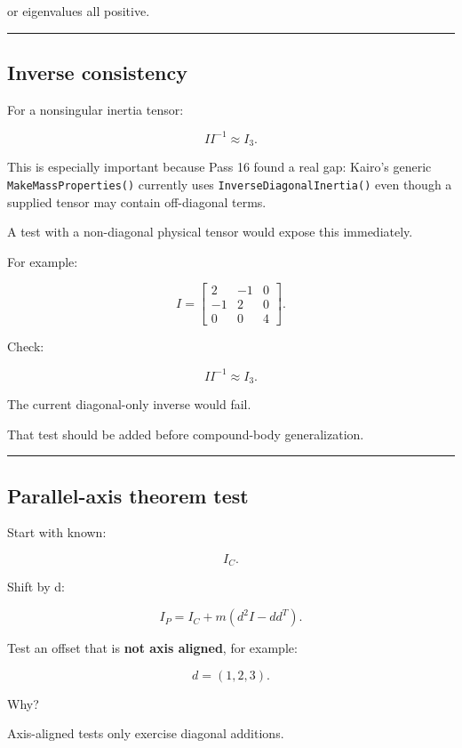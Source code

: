 or eigenvalues all positive.

\begin{center}\rule{0.5\linewidth}{0.5pt}\end{center}

\subsection{Inverse consistency}\label{06-engine-ii-ch039-inverse-consistency}

For a nonsingular inertia tensor:

\[
\boxed{
II^{-1}\approx I_3.
}
\]

This is especially important because Pass 16 found a real gap: Kairo's generic \texttt{MakeMassProperties()} currently uses \texttt{InverseDiagonalInertia()} even though a supplied tensor may contain off-diagonal terms.

A test with a non-diagonal physical tensor would expose this immediately.

For example:

\[
I=
\begin{bmatrix}
2&-1&0\\
-1&2&0\\
0&0&4
\end{bmatrix}.
\]

Check:

\[
II^{-1}\approx I_3.
\]

The current diagonal-only inverse would fail.

That test should be added before compound-body generalization.

\begin{center}\rule{0.5\linewidth}{0.5pt}\end{center}

\subsection{Parallel-axis theorem test}\label{06-engine-ii-ch039-parallel-axis-theorem-test}

Start with known:

\[
I_C.
\]

Shift by d:

\[
I_P
=
I_C+
m(d^2I-dd^T).
\]

Test an offset that is \textbf{not axis aligned}, for example:

\[
d=(1,2,3).
\]

Why?

Axis-aligned tests only exercise diagonal additions.

